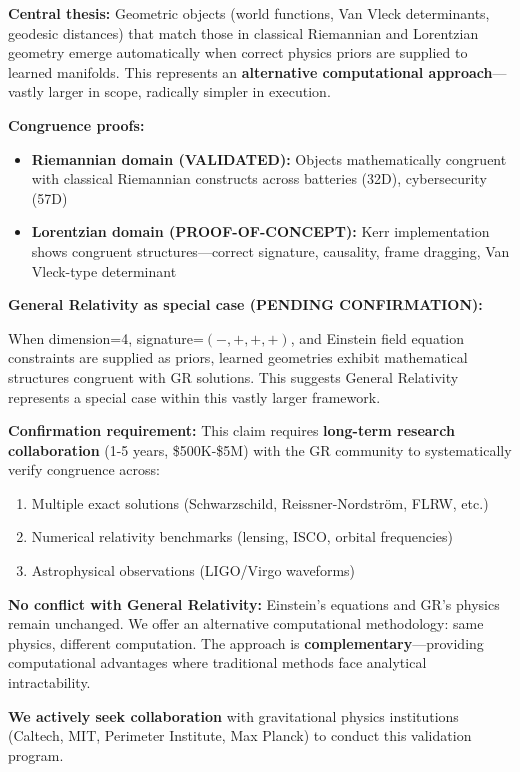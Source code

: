\documentclass[11pt,a4paper]{article}
\begin{document}
\textbf{Central thesis:} Geometric objects (world functions, Van Vleck determinants, geodesic distances) that match those in classical Riemannian and Lorentzian geometry emerge automatically when correct physics priors are supplied to learned manifolds. This represents an \textbf{alternative computational approach}—vastly larger in scope, radically simpler in execution.

\textbf{Congruence proofs:}
\begin{itemize}
\item \textbf{Riemannian domain (VALIDATED):} Objects mathematically congruent with classical Riemannian constructs across batteries (32D), cybersecurity (57D)
\item \textbf{Lorentzian domain (PROOF-OF-CONCEPT):} Kerr implementation shows congruent structures—correct signature, causality, frame dragging, Van Vleck-type determinant
\end{itemize}

\textbf{General Relativity as special case (PENDING CONFIRMATION):}

When dimension=4, signature=$(-,+,+,+)$, and Einstein field equation constraints are supplied as priors, learned geometries exhibit mathematical structures congruent with GR solutions. This suggests General Relativity represents a special case within this vastly larger framework.

\textbf{Confirmation requirement:} This claim requires \textbf{long-term research collaboration} (1-5 years, \$500K-\$5M) with the GR community to systematically verify congruence across:
\begin{enumerate}
\item Multiple exact solutions (Schwarzschild, Reissner-Nordström, FLRW, etc.)
\item Numerical relativity benchmarks (lensing, ISCO, orbital frequencies)
\item Astrophysical observations (LIGO/Virgo waveforms)
\end{enumerate}

\textbf{No conflict with General Relativity:} Einstein's equations and GR's physics remain unchanged. We offer an alternative computational methodology: same physics, different computation. The approach is \textbf{complementary}—providing computational advantages where traditional methods face analytical intractability.

\textbf{We actively seek collaboration} with gravitational physics institutions (Caltech, MIT, Perimeter Institute, Max Planck) to conduct this validation program.
\end{document}

